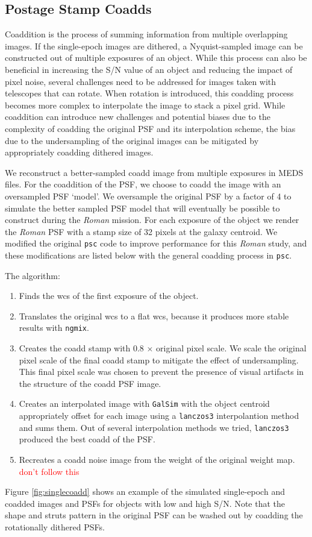 \documentclass[fleqn,usenatbib]{mnras}
\begin{document}
\subsection{Postage Stamp Coadds}
\label{subsec:psc}
Coaddition is the process of summing information from multiple overlapping images. If the single-epoch images are dithered, a Nyquist-sampled image can be constructed out of multiple exposures of an object. While this process can also be beneficial in increasing the S/N value of an object and reducing the impact of pixel noise, several challenges need to be addressed for images taken with telescopes that can rotate. When rotation is introduced, this coadding process becomes more complex to interpolate the image to stack a pixel grid. While coaddition can introduce new challenges and potential biases due to the complexity of coadding the original PSF and its interpolation scheme, the bias due to the undersampling of the original images can be mitigated by appropriately coadding dithered images. 

We reconstruct a better-sampled coadd image from multiple exposures in MEDS files. For the coaddition of the PSF, we choose to coadd the image with an oversampled PSF `model'. We oversample the original PSF by a factor of 4 to simulate the better sampled PSF model that will eventually be possible to construct during the \emph{Roman} mission. For each exposure of the object we render the \emph{Roman} PSF with a stamp size of 32 pixels at the galaxy centroid. We modified the original \texttt{psc} code to improve performance for this \emph{Roman} study, and these modifications are listed below with the general coadding process in \texttt{psc}. 

The algorithm: 
\begin{enumerate}
    \setlength\itemsep{1em}
    \item Finds the wcs of the first exposure of the object.
    \item Translates the original wcs to a flat wcs, because it produces more stable results with \texttt{ngmix}.
    \item Creates the coadd stamp with 0.8 $\times$ original pixel scale. We scale the original pixel scale of the final coadd stamp to mitigate the effect of undersampling. This final pixel scale was chosen to prevent the presence of visual artifacts in the structure of the coadd PSF image. 
    \item Creates an interpolated image with \texttt{GalSim} with the object centroid appropriately offset for each image using a \texttt{lanczos3} interpolantion method and sums them. Out of several interpolation methods we tried, \texttt{lanczos3} produced the best coadd of the PSF.
    \item Recreates a coadd noise image from the weight of the original weight map. \textcolor{red}{don't follow this}
\end{enumerate}
Figure \ref{fig:singlecoadd} shows an example of the simulated single-epoch and coadded images and PSFs for objects with low and high S/N. Note that the shape and struts pattern in the original PSF can be washed out by coadding the rotationally dithered PSFs. 
\end{document}

